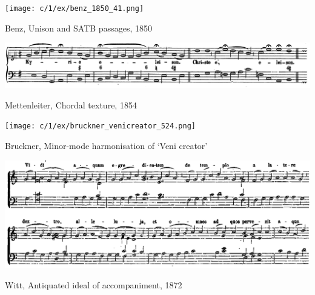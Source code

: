 \vspace*{\fill}

\newpage

\begin{landscape}

  \vspace*{\fill}

  \begin{example}
    \centering
    \texttt{[image: c/1/ex/benz\_1850\_41.png]}
    \caption{Benz, Unison and SATB passages, 1850}
    \label{mus:benz_1850_41}
  \end{example}

  \vspace*{\fill}

\end{landscape}

\begin{landscape}

  \vspace*{\fill}

  \begin{example}
    \centering
    \includegraphics[width=.8\linewidth]{c/1/ex/mettenleiter_enchiridion_8.png}
    \caption{Mettenleiter, Chordal texture, 1854}
    \label{mus:mettenleiter_enchiridion_8}
  \end{example}

  \vspace*{\fill}

  \begin{example}
    \centering
    \texttt{[image: c/1/ex/bruckner\_venicreator\_524.png]}
    \caption{Bruckner, Minor-mode harmonisation of `Veni creator'}
    \label{mus:bruckner_venicreator_524}
  \end{example}

  \vspace*{\fill}

\end{landscape}

\begin{landscape}

  \vspace*{\fill}

  \begin{example}
    \centering
    \includegraphics[width=.8\linewidth]{c/1/ex/witt_appendix.png}
    \caption{Witt, Antiquated ideal of accompaniment, 1872}
    \label{mus:witt_appendix}
  \end{example}

  \vspace*{\fill}

\end{landscape}

